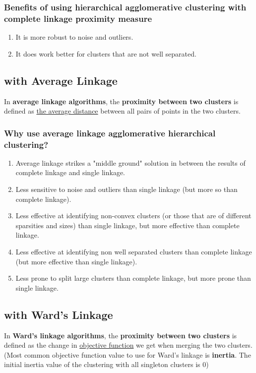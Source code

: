 \documentclass[11pt]{elegantbook}
\begin{document}
\subsubsection*{Benefits of using hierarchical agglomerative clustering with complete linkage proximity measure}
\begin{enumerate}[1.]
    \item It is more robust to noise and outliers.
    \item It does work better for clusters that are not well separated.
\end{enumerate}

\subsection{with Average Linkage}
In \textbf{average linkage algorithms}, the \textbf{proximity between two clusters} is defined as \underline{the average distance} between all pairs of points in the two clusters.

\subsubsection*{Why use average linkage agglomerative hierarchical clustering?}
\begin{enumerate}[1.]
    \item Average linkage strikes a "middle ground" solution in between the results of complete linkage and single linkage.
    \item Less sensitive to noise and outliers than single linkage (but more so than complete linkage).
    \item Less effective at identifying non-convex clusters (or those that are of different sparsities and sizes) than single linkage, but more effective than complete linkage.
    \item Less effective at identifying non well separated clusters than complete linkage (but more effective than single linkage).
    \item Less prone to split large clusters than complete linkage, but more prone than single linkage.
\end{enumerate}

\subsection{with Ward's Linkage}
In \textbf{Ward's linkage algorithms}, the \textbf{proximity between two clusters} is defined as the change in  \underline{objective function} we get when merging the two clusters.\\
(Most common objective function value to use for Ward's linkage is \textbf{inertia}. The initial inertia value of the clustering with all singleton clusters is $0$)
\end{document}
